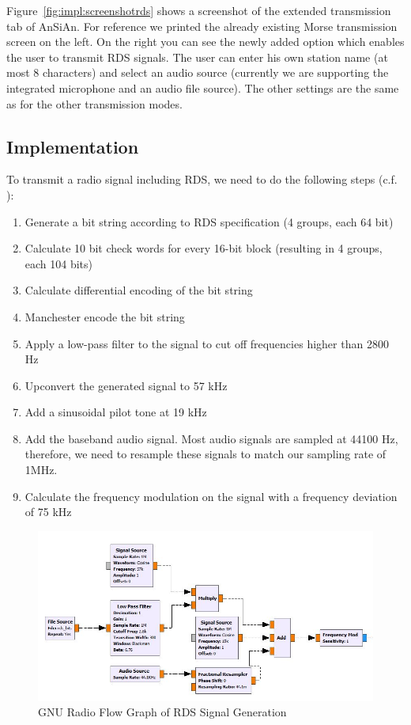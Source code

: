 Figure~\ref{fig:impl:screenshotrds} shows a screenshot of the extended transmission tab of AnSiAn. For reference we printed the already existing Morse transmission screen on the left. On the right you can see the newly added option which enables the user to transmit RDS signals. The user can enter his own station name (at most 8 characters) and select an audio source (currently we are supporting the integrated microphone and an audio file source). The other settings are the same as for the other transmission modes. 


\subsection{Implementation}
To transmit a radio signal including RDS, we need to do the following steps (c.f. \cite{RDS1999}):

\begin{enumerate}
	\item Generate a bit string according to RDS specification (4 groups, each 64 bit)
	\item Calculate 10 bit check words for every 16-bit block (resulting in 4 groups, each 104 bits)
	\item Calculate differential encoding of the bit string
	\item Manchester encode the bit string
	\item Apply a low-pass filter to the signal to cut off frequencies higher than 2800 Hz
	\item Upconvert the generated signal to 57 kHz
	\item Add a sinusoidal pilot tone at 19 kHz
	\item Add the baseband audio signal. Most audio signals are sampled at 44100 Hz, therefore, we need to resample these signals to match our sampling rate of 1MHz. 
	\item Calculate the frequency modulation on the signal with a frequency deviation of 75 kHz 	
\end{enumerate}

\begin{figure}[!htbp]
	\centering
	\includegraphics[width=1.3\linewidth]{gfx/rds_gnu.jpg}
	\caption{GNU Radio Flow Graph of RDS Signal Generation}
	\label{fig:impl:rdsgnu}
\end{figure}

